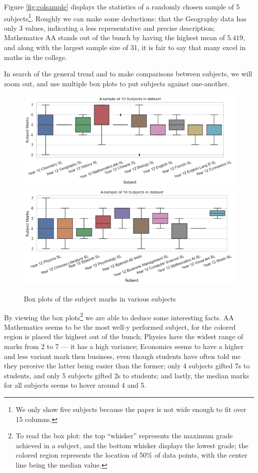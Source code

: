 \documentclass[a4paper,12pt]{tufte-handout}
\begin{document}
Figure \ref{fig:colsample} displays the statistics of a randomly chosen sample of 5 subjects\footnote{We only show five subjects because the paper is not wide enough to fit over 15 columns.}. Roughly we can make some deductions: that the Geography data has only 3 values, indicating a less representative and precise description; Mathematics AA stands out of the bunch by having the highest mean of $5.419$, and along with the largest sample size of 31, it is fair to say that many excel in maths in the college.

In search of the general trend and to make comparisons between subjects, we will zoom out, and use multiple box plots to put subjects against one-another.

\begin{figure}
    \centering
    \includegraphics[width=\textwidth]{assets/subject_s0.png}
    \includegraphics[width=\textwidth]{assets/subject_s1.png}
    \caption{Box plots of the subject marks in various subjects}
    \label{fig:subjects}
\end{figure}

By viewing the box plots\footnote{To read the box plot: the top ``whisker'' represents the maximum grade achieved in a subject, and the bottom whisker displays the lowest grade; the colored region represents the location of 50\% of data points, with the center line being the median value.} we are able to deduce some interesting facts. AA Mathematics seems to be the most well-y performed subject, for the colored region is placed the highest out of the bunch; Physics have the widest range of marks from 2 to 7 --- it has a high variance; Economics seems to have a higher and less variant mark then business, even though students have often told me they perceive the latter being easier than the former; only 4 subjects gifted 7s to students, and only 5 subjects gifted 2s to students; and lastly, the median marks for all subjects seems to hover around 4 and 5.
\end{document}
